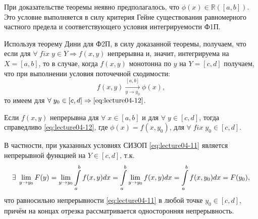 \begin{notes}
	\item При доказательстве теоремы неявно предполагалось, что $\phi(x) \in \mathbb{R}([a,b])$. Это условие выполняется в силу критерия Гейне существования равномерного частного предела и соответствующего условия интегрируемости Ф1П.
	\item Используя теорему Дини для Ф2П, в силу доказанной теоремы, получаем, что если для $\forall \; fix \; y \in Y \Rightarrow f(x,y)$ непрерывна и, значит, интегрируема на $X = [a,b]$, то в случае, когда $f(x,y)$ монотонна по $y$ на $Y = [c,d]$ получаем, что при выполнении условия поточечной сходимости:
	\begin{equation*}
	f(x,y) \underset{y \to y_0}{\overset{[a,b]}{\rightarrow}} \phi(x),
	\end{equation*}
	то имеем для $\forall \; y_0 \in [c,d] \Rightarrow \eqref{eq:lecture04-12}$.
	\item Если $f(x,y)$ непрерывна для $\forall \; x \in [a,b]$ и для $\forall \; y \in [c,d]$, тогда справедливо \eqref{eq:lecture04-12}, где $\phi(x) = f(x, y_0)$, для $\forall \; fix \; y_0 \in [c,d]$.

	В частности, при указанных условиях СИЗОП \eqref{eq:lecture04-11} является непрерывной функцией на $Y \in [c,d]$, т.к.
	\begin{equation*}
	\exists \; \lim\limits_{y \to y_0} F(y) = \lim\limits_{y \to y_0} \displaystyle\int\limits_a^b f(x,y)dx = \displaystyle\int\limits_a^b \lim\limits_{y \to y_0} f(x,y)dx= \displaystyle\int\limits_a^b f(x,y_0)dx = F(y_0),
	\end{equation*}
	что равносильно непрерывности \eqref{eq:lecture04-11} в любой точке $y_0 \in [c,d]$, причём на концах отрезка рассматривается односторонняя непрерывность.
\end{notes}
